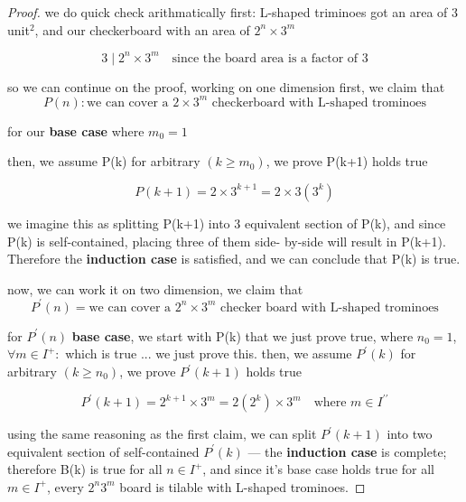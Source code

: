  \begin{proof}
  we do quick check arithmatically first: L-shaped triminoes got an
  area of 3 unit$^2$, and our checkerboard with an area of $2^n \times
  3^m$

  \[
  3 \mid 2^n \times 3^m \quad \text{since the board area is a factor of 3}
  \]

  so we can continue on the proof, working on one dimension first, we
  claim that
  \[
  P(n) : \text{we can cover a } 2 \times 3^m \text{ checkerboard with
  L-shaped trominoes}
  \]

  for our \textbf{base case} where $m_0 = 1$


    \begin{center}
  \end{center}    
    then, we assume P(k) for arbitrary $(k \ge m_0)$, we prove P(k+1)
    holds true

  \[
  P(k+1) = 2 \times 3^{k+1} = 2 \times 3(3^k)
  \]

  we imagine this as splitting P(k+1) into 3 equivalent section of
  P(k), and since P(k) is self-contained, placing three of them side-
  by-side will result in P(k+1). Therefore the \textbf{induction case}
  is satisfied, and we can conclude that P(k) is true.

     \vspace{1em}
  now, we can work it on two dimension, we claim that
  \[
  P^{\prime}(n) = \text{we can cover a } 2^n \times 3^m \text{ checker
  board with L-shaped trominoes}
  \]

  for $P^{\prime}(n)$ \textbf{base case}, we start with P(k) that
  we just prove true, where $n_0 = 1$, $\forall m \in I^+:$ which is
  true ... we just prove this. then, we assume $P^{\prime}(k)$ for arbitrary $(k \ge n_0)$, we
  prove $P^{\prime}(k+1)$ holds true

  \[
  P^{\prime}(k+1) = 2^{k+1} \times 3^m = 2(2^k) \times 3^m \quad
  \text{where } m \in I^{\prime\prime}
  \]

  using the same reasoning as the first claim, we can split
  $P^{\prime}(k+1)$ into two equivalent section of self-contained
  $P^{\prime}(k)$ --- the \textbf{induction case} is complete;
  therefore B(k) is true for all $n \in I^+$, and since it's base case
  holds true for all $m \in I^+$, every $2^n 3^m$ board is tilable
  with L-shaped trominoes.
  \end{proof}

